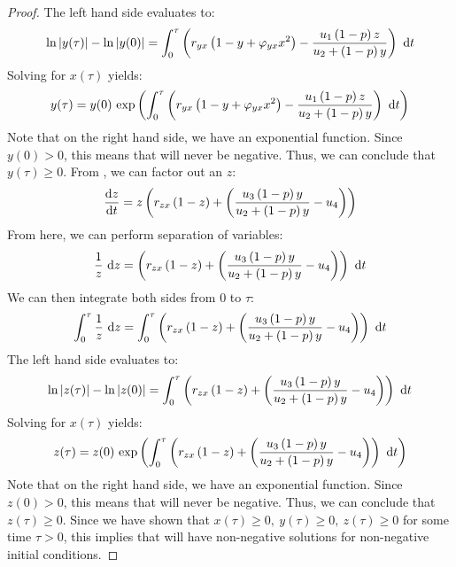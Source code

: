 \begin{proof}
    The left hand side evaluates to:
    \begin{equation*}
        \ln{y(\tau)}-\ln{y(0)} = \int_0^\tau \left(r_{yx}\left(1-y+\varphi_{yx}x^2\right)-\frac{u_1\left(1-p\right)z}{u_2+\left(1-p\right)y}\right)\ \opdiff{t}
    \end{equation*}
    Solving for $x(\tau)$ yields:
    \begin{equation*}
        y(\tau) = y(0)\ \exp{\int_0^\tau \left(r_{yx}\left(1-y+\varphi_{yx}x^2\right)-\frac{u_1\left(1-p\right)z}{u_2+\left(1-p\right)y}\right)\ \opdiff{t}}
    \end{equation*}
    Note that on the right hand side, we have an exponential function. Since $y(0) > 0$, this means that will never be negative. Thus, we can conclude that $y(\tau) \geq 0$. From , we can factor out an $z$:
    \begin{equation*}
        \diff[]{z}{t} = z\left(r_{zx}\left(1-z\right)+\left(\frac{u_3\left(1-p\right)y}{u_2+\left(1-p\right)y}-u_4\right)\right)
    \end{equation*}
    From here, we can perform separation of variables:
    \begin{equation*}
        \frac{1}{z}\ \opdiff{z} = \left(r_{zx}\left(1-z\right)+\left(\frac{u_3\left(1-p\right)y}{u_2+\left(1-p\right)y}-u_4\right)\right)\ \opdiff{t}
    \end{equation*}
    We can then integrate both sides from 0 to $\tau$:
    \begin{equation*}
        \int_0^\tau \frac{1}{z}\ \opdiff{z} = \int_0^\tau \left(r_{zx}\left(1-z\right)+\left(\frac{u_3\left(1-p\right)y}{u_2+\left(1-p\right)y}-u_4\right)\right)\ \opdiff{t}
    \end{equation*}
    The left hand side evaluates to:
    \begin{equation*}
        \ln{z(\tau)}-\ln{z(0)} = \int_0^\tau \left(r_{zx}\left(1-z\right)+\left(\frac{u_3\left(1-p\right)y}{u_2+\left(1-p\right)y}-u_4\right)\right)\ \opdiff{t}
    \end{equation*}
    Solving for $x(\tau)$ yields:
    \begin{equation*}
        z(\tau) = z(0)\ \exp{\int_0^\tau \left(r_{zx}\left(1-z\right)+\left(\frac{u_3\left(1-p\right)y}{u_2+\left(1-p\right)y}-u_4\right)\right)\ \opdiff{t}}
    \end{equation*}
    Note that on the right hand side, we have an exponential function. Since $z(0) > 0$, this means that will never be negative. Thus, we can conclude that $z(\tau) \geq 0$. Since we have shown that $x(\tau) \geq 0,\ y(\tau) \geq 0,\ z(\tau) \geq 0$ for some time $\tau > 0$, this implies that  will have non-negative solutions for non-negative initial conditions.
\end{proof}

